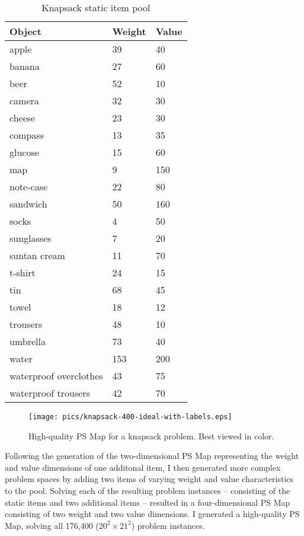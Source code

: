 \begin{table}
\begin{center}
  \begin{tabular}{|p{5cm}|p{1.5cm}|p{1.5cm}|}
    \hline
    \textbf{Object} & \textbf{Weight} & \textbf{Value} \\ \hline
    apple & 39 & 40 \\ \hline
    banana & 27 & 60 \\ \hline
    beer & 52 & 10 \\ \hline
    camera & 32 & 30 \\ \hline
    cheese & 23 & 30 \\ \hline
    compass & 13 & 35 \\ \hline
    glucose & 15 & 60 \\ \hline
    map & 9 & 150 \\ \hline
    note-case & 22 & 80 \\ \hline
    sandwich & 50 & 160 \\ \hline
    socks & 4 & 50 \\ \hline
    sunglasses & 7 & 20 \\ \hline
    suntan cream & 11 & 70 \\ \hline
    t-shirt & 24 & 15 \\ \hline
    tin & 68 & 45 \\ \hline
    towel & 18 & 12 \\ \hline
    trousers & 48 & 10 \\ \hline
    umbrella & 73 & 40 \\ \hline
    water & 153 & 200 \\ \hline
    waterproof overclothes & 43 & 75 \\ \hline
    waterproof trousers & 42 & 70 \\
    \hline
  \end{tabular}
  \caption{Knapsack static item pool}
  \label{tab:knapsack-item-pool}
\end{center}
\end{table}

\begin{figure}
\begin{center}
\texttt{[image: pics/knapsack-400-ideal-with-labels.eps]}
\caption{High-quality PS Map for a knapsack problem.  Best viewed in color.}
\label{fig:knapsack-ideal}
\end{center}
\end{figure}

Following the generation of the two-dimensional PS Map representing the weight and value dimensions of one additonal item, I then generated more complex problem spaces  by adding two  items of varying weight and value characteristics to the pool.  Solving each of the resulting problem instances -- consisting of the static items and two additional items -- resulted in a four-dimensional PS Map consisting of two weight and two value dimensions.  I generated a high-quality PS Map, solving all 176,400 ($20^2 \times 21^2$) problem instances.  

